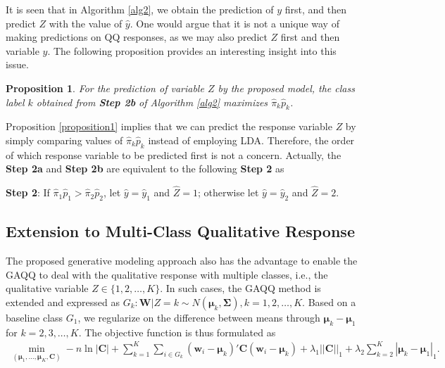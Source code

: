 \documentclass[12pt]{article}
\newtheorem{proposition}{Proposition}%
\begin{document}
It is seen that in Algorithm \ref{alg2}, we obtain the prediction of $y$ first, and then predict $Z$ with the value of $\hat{y}$.
One would argue that it is not a unique way of making predictions on QQ responses, as we may also predict $Z$ first and then variable $y$.
The following proposition provides an interesting insight into this issue.

\begin{proposition}{}{\label{proposition1}}
For the prediction of variable $Z$ by the proposed model, the class label $k$ obtained from {\bf Step 2b} of Algorithm \ref{alg2} maximizes $\hat{\pi}_k \hat{p}_k$.
\end{proposition}

Proposition \ref{proposition1} implies that we can predict the response variable $Z$ by simply comparing values of $\hat{\pi}_k \hat{p}_k$ instead of employing LDA.
Therefore, the order of which response variable to be predicted first is not a concern.
Actually, the {\bf Step 2a} and {\bf Step 2b} are equivalent to the following {\bf Step 2} as

{\bf Step 2}: If $\hat{\pi}_1 \hat{p}_1 > \hat{\pi}_2 \hat{p}_2$, let $\hat{y} = \hat{y}_{1}$ and $\hat{Z} = 1$; otherwise let $\hat{y} = \hat{y}_{2}$ and $\hat{Z} = 2$.

\subsection{Extension to Multi-Class Qualitative Response}
The proposed generative modeling approach also has the advantage to enable the GAQQ to deal with the qualitative response with multiple classes,
i.e., the qualitative variable $Z \in \{1,2, \ldots, K\}$. In such cases, the GAQQ method is extended and expressed as $G_{k}: \bm W|Z = k \sim N(\bm \mu_k, \bm \Sigma), k = 1, 2, \ldots, K$.
Based on a baseline class $G_{1}$, we regularize on the difference between means through $\bm \mu_{k} - \bm \mu_{1}$ for $k = 2, 3, \ldots, K$.
The objective function is thus formulated as
\begin{align}\label{eq: obj-multi-class1}
\min_{(\bm \mu_1, \ldots, \bm \mu_K,\bm C)} -n\ln|\bm C| + \sum_{k=1}^{K} \sum_{i\in G_k}(\bm w_i-\bm \mu_k)' \bm C (\bm w_i-\bm \mu_k)+\lambda_1||\bm C||_1 + \lambda_2 \sum_{k=2}^{K}|\bm \mu_k-\bm \mu_1|_1.
\end{align}
\end{document}
